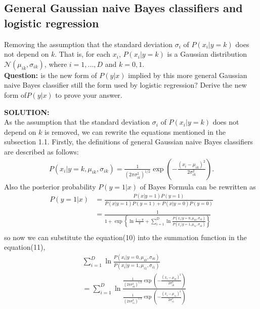 \documentclass[UTF8,12pt, a4paper]{ctexart}
\begin{document}
\subsection{General Gaussian naive Bayes classifiers and logistic regression}

Removing the assumption that the standard deviation $\sigma_i$ of $P(x_i|y=k)$ does not depend on $k$. That is, for each $x_i$, $P(x_i|y = k)$ is a Gaussian distribution $\mathcal{N}(\mu_{ik}, \sigma_{ik})$, where $i = 1,...,D$ and $k = 0,1$. \\
\textbf{\large{Question: }}is the new form of $P(y|x)$ implied by this more general Gaussian naive Bayes classifier still the form used by logistic regression? Derive the new form of$ P(y|x)$ to prove your answer. \\
\begin{tcolorbox}
\textbf{\large{SOLUTION: }} \\
As the assumption that the standard deviation $\sigma_i$ of $P(x_i|y=k)$ does not depend on $k$ is removed, we can rewrite the equations mentioned in the subsection 1.1.
Firstly, the definitions of general Gaussian naive Bayes classifiers are described as follows:
\begin{align}
  P(x_i|y=k,\mu_{ik}, \sigma_{ik}) = \frac{1}{(2\pi\sigma_{ik}^2)^{1/2}} \exp\left(-\frac{(x_i-\mu_{ik})^2}{2\sigma_{ik}^2}\right).
\end{align}
Also the posterior probability $P(y=1|x)$ of Bayes Formula can be rewritten as
\begin{equation}
  \begin{aligned}
    P(y=1|x)&=\frac{P(x|y=1)P(y=1)}{P(x|y=1)P(y=1)+ P(x|y=0)P(y=0)} \\
    & = \frac{1}{1+\exp\left\{ \ln\frac{1-\pi}{\pi} +\sum_{i=1}^{D}\ln \frac{P(x_i|y=0, \mu_{i0}, \sigma_{ik})}{P(x_i|y=1, \mu_{i1}, \sigma_{ik})}\right\}}  \\
  \end{aligned}
\end{equation}
so now we can substitute the equation(10) into the summation function in the equation(11),
\begin{align*}
    &\sum_{i=1}^{D}\ln \frac{P(x_i|y=0,\mu_{i0}, \sigma_{i0})}{P(x_i|y=1,\mu_{i1}, \sigma_{i1})} \\
    &=\sum_{i=1}^{D}\ln \frac{
        \frac{1}{(2\pi\sigma_{i0}^2)^{1/2}} \exp\left(-\frac{(x_i-\mu_{i0})^2}{2\sigma_{i0}^2}\right)
      }{
        \frac{1}{(2\pi\sigma_{i1}^2)^{1/2}} \exp\left(-\frac{(x_i-\mu_{i1})^2}{2\sigma_{i1}^2}\right)
}
\end{align*}
\end{tcolorbox}
\end{document}
